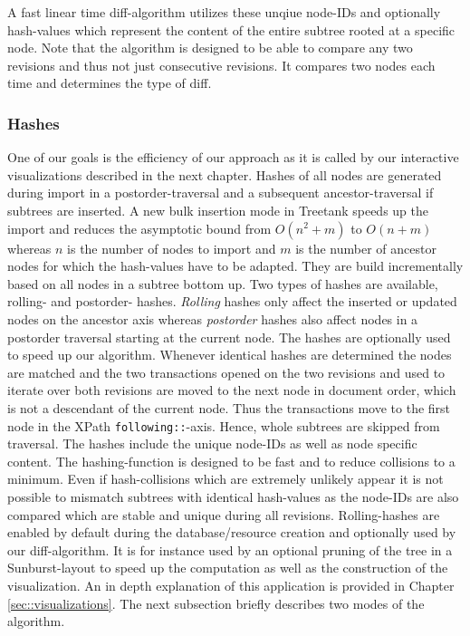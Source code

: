 A fast linear time diff-algorithm utilizes these unqiue node-IDs and optionally hash-values which represent the content of the entire subtree rooted at a specific node. Note that the algorithm is designed to be able to compare any two revisions and thus not just consecutive revisions. It compares two nodes each time and determines the type of diff. 


\subsubsection{Hashes} One of our goals is the efficiency of our approach as it is called by our interactive visualizations described in the next chapter. Hashes of all nodes are generated during import in a postorder-traversal and a subsequent ancestor-traversal if subtrees are inserted. A new bulk insertion mode in Treetank speeds up the import and reduces the asymptotic bound from $O(n^2+m)$ to $O(n+m)$ whereas $n$ is the number of nodes to import and $m$ is the number of ancestor nodes for which the hash-values have to be adapted. They are build incrementally based on all nodes in a subtree bottom up. Two types of hashes are available, rolling\cite{Rolling2011}- and postorder\cite{Integrity2010}- hashes. \emph{Rolling} hashes only affect the inserted or updated nodes on the ancestor axis whereas \emph{postorder} hashes also affect nodes in a postorder traversal starting at the current node. The hashes are optionally used to speed up our algorithm. Whenever identical hashes are determined the nodes are matched and the two transactions opened on the two revisions and used to iterate over both revisions are moved to the next node in document order, which is not a descendant of the current node. Thus the transactions move to the first node in the XPath \texttt{following::}-axis. Hence, whole subtrees are skipped from traversal. The hashes include the unique node-IDs as well as node specific content. The hashing-function is designed to be fast and to reduce collisions to a minimum. Even if hash-collisions which are extremely unlikely appear it is not possible to mismatch subtrees with identical hash-values as the node-IDs are also compared which are stable and unique during all revisions. Rolling-hashes are enabled by default during the database/resource creation and optionally used by our diff-algorithm. It is for instance used by an optional pruning of the tree in a Sunburst-layout to speed up the computation as well as the construction of the visualization. An in depth explanation of this application is provided in Chapter \ref{sec::visualizations}. The next subsection briefly describes two modes of the algorithm.

